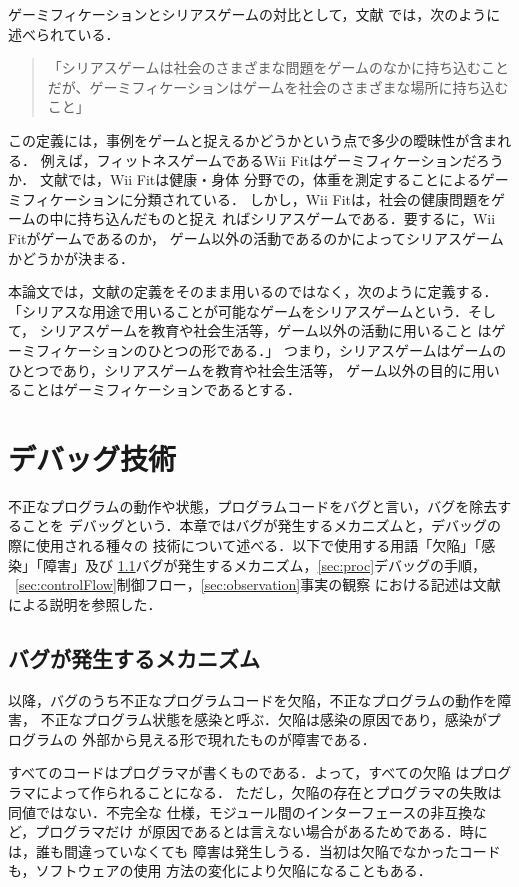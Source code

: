 \documentclass{jreport}
\begin{document}
ゲーミフィケーションとシリアスゲームの対比として，文献
\cite{Inoue:Gamification}では，次のように述べられている．

\begin{quote}
  「シリアスゲームは社会のさまざまな問題をゲームのなかに持ち込むこと
  だが、ゲーミフィケーションはゲームを社会のさまざまな場所に持ち込む
  こと」\cite{Inoue:Gamification}
\end{quote}

この定義には，事例をゲームと捉えるかどうかという点で多少の曖昧性が含まれる．
例えば，フィットネスゲームであるWii Fitはゲーミフィケーションだろうか．
文献\cite{Inoue:Gamification}では，Wii Fitは健康・身体
分野での，体重を測定することによるゲーミフィケーションに分類されている．
しかし，Wii Fitは，社会の健康問題をゲームの中に持ち込んだものと捉え
ればシリアスゲームである．要するに，Wii Fitがゲームであるのか，
ゲーム以外の活動であるのかによってシリアスゲームかどうかが決まる．

本論文では，文献\cite{Inoue:Gamification}の定義をそのまま用いるのではなく，次のように定義する．
「シリアスな用途で用いることが可能なゲームをシリアスゲームという．そして，
シリアスゲームを教育や社会生活等，ゲーム以外の活動に用いること
はゲーミフィケーションのひとつの形である．」
つまり，シリアスゲームはゲームのひとつであり，シリアスゲームを教育や社会生活等，
ゲーム以外の目的に用いることはゲーミフィケーションであるとする．

\chapter{デバッグ技術}
不正なプログラムの動作や状態，プログラムコードをバグと言い，バグを除去することを
デバッグという．本章ではバグが発生するメカニズムと，デバッグの際に使用される種々の
技術について述べる．以下で使用する用語「欠陥」「感染」「障害」及び
\ref{sec:mechanism}バグが発生するメカニズム，\ref{sec:proc}デバッグの手順，
~\ref{sec:controlFlow}制御フロー，\ref{sec:observation}事実の観察
における記述は文献\cite{Andreas:Debugging}による説明を参照した．

\section{バグが発生するメカニズム}
\label{sec:mechanism}
以降，バグのうち不正なプログラムコードを欠陥，不正なプログラムの動作を障害，
不正なプログラム状態を感染と呼ぶ．欠陥は感染の原因であり，感染がプログラムの
外部から見える形で現れたものが障害である．

すべてのコードはプログラマが書くものである．よって，すべての欠陥
はプログラマによって作られることになる．
ただし，欠陥の存在とプログラマの失敗は同値ではない．不完全な
仕様，モジュール間のインターフェースの非互換など，プログラマだけ
が原因であるとは言えない場合があるためである．時には，誰も間違っていなくても
障害は発生しうる．当初は欠陥でなかったコードも，ソフトウェアの使用
方法の変化により欠陥になることもある．
\end{document}
